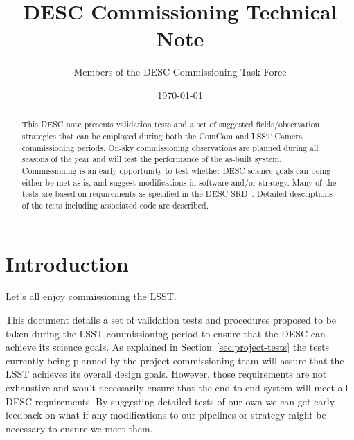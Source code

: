 \documentclass[modern]{desc-tex/styles/lsstdescnote}
\begin{document}
\title{DESC Commissioning Technical Note}
\author{Members of the DESC Commissioning Task Force}
\date{\today}

\begin{abstract}

  This DESC note presents validation tests and a set of suggested fields/observation strategies that can be employed during both the ComCam and LSST Camera commissioning periods.  On-sky commissioning observations are planned during all seasons of the year and will test the performance of the as-built system.  Commissioning is an early opportunity to test whether DESC science goals can being either be met as is, and suggest modifications in software and/or strategy.  Many of the tests are based on requirements as specified in the DESC SRD~\cite{DESC-SRD}.  Detailed descriptions of the tests including associated code are described.  
  
 \end{abstract}

\maketitle

\noindent
\begin{center}
  \fboxsep=5pt  
 \end{center} 
\vspace{0.1in}

\section{Introduction}

Let's all enjoy commissioning the LSST.

This document details a set of validation tests and procedures proposed to be taken during the LSST commissioning period to ensure that the DESC can achieve its science goals.  As explained in Section~\ref{sec:project-tests} the tests currently being planned by the project commissioning team will assure that the LSST achieves its overall design goals. However, those requirements are not exhaustive and won't necessarily ensure that the end-to-end system will meet all DESC requirements.  By suggesting detailed tests of our own we can get early feedback on what if any modifications to our pipelines or strategy might be necessary to ensure we meet them.
\end{document}
